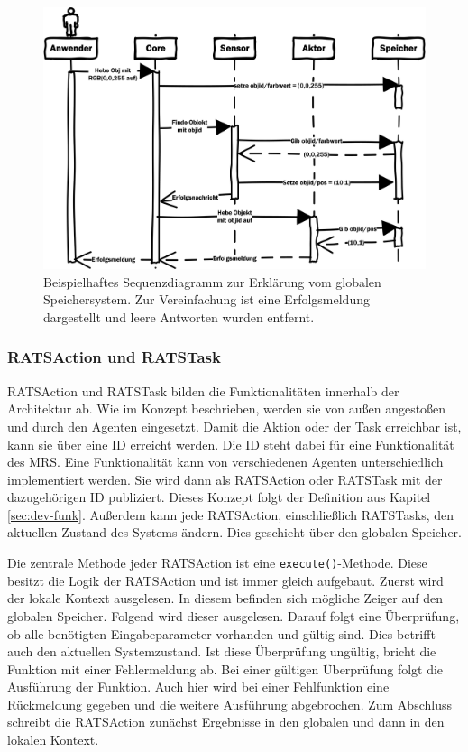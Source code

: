 \begin{figure}
	\centering
	\includegraphics[scale=1.0]{fig/seqspeicher}
	\caption[RATS globaler Speicher]{Beispielhaftes Sequenzdiagramm zur Erklärung vom globalen Speichersystem. Zur Vereinfachung ist eine Erfolgsmeldung dargestellt und leere Antworten wurden entfernt.}
	\label{fig:seqspeicher}
\end{figure}

\subsubsection{RATSAction und RATSTask}
RATSAction und RATSTask bilden die Funktionalitäten innerhalb der Architektur ab. Wie im Konzept beschrieben, werden sie von außen angestoßen und durch den Agenten eingesetzt. Damit die Aktion oder der Task erreichbar ist, kann sie über eine ID erreicht werden. Die ID steht dabei für eine Funktionalität des MRS. Eine Funktionalität kann von verschiedenen Agenten unterschiedlich implementiert werden. Sie wird dann als RATSAction oder RATSTask mit der dazugehörigen ID publiziert. Dieses Konzept folgt der Definition aus Kapitel \ref{sec:dev-funk}. Außerdem kann jede RATSAction, einschließlich RATSTasks, den aktuellen Zustand des Systems ändern. Dies geschieht über den globalen Speicher. 

Die zentrale Methode jeder RATSAction ist eine \lstinline|execute()|-Methode. Diese besitzt die Logik der RATSAction und ist immer gleich aufgebaut. Zuerst wird der lokale Kontext ausgelesen. In diesem befinden sich mögliche Zeiger auf den globalen Speicher. Folgend wird dieser ausgelesen. Darauf folgt eine Überprüfung, ob alle benötigten Eingabeparameter vorhanden und gültig sind. Dies betrifft auch den aktuellen Systemzustand. Ist diese Überprüfung ungültig, bricht die Funktion mit einer Fehlermeldung ab. Bei einer gültigen Überprüfung folgt die Ausführung der Funktion. Auch hier wird bei einer Fehlfunktion eine Rückmeldung gegeben und die weitere Ausführung abgebrochen. Zum Abschluss schreibt die RATSAction zunächst Ergebnisse in den globalen und dann in den lokalen Kontext. 

